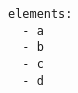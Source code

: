 \par\begin{minipage}{60ex}
\begin{verbatim}
elements:
  - a
  - b
  - c
  - d

\end{verbatim}
\end{minipage}\par